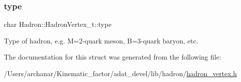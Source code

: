\subsubsection{\texorpdfstring{type}{type}}
{\footnotesize\ttfamily char Hadron\+::\+Hadron\+Vertex\+\_\+t\+::type}

Type of hadron, e.\+g. M=2-\/quark meson, B=3-\/quark baryon, etc. 

The documentation for this struct was generated from the following file\+:\begin{DoxyCompactItemize}
\item 
/\+Users/archanar/\+Kinematic\+\_\+factor/adat\+\_\+devel/lib/hadron/\mbox{\hyperlink{lib_2hadron_2hadron__vertex_8h}{hadron\+\_\+vertex.\+h}}\end{DoxyCompactItemize}
